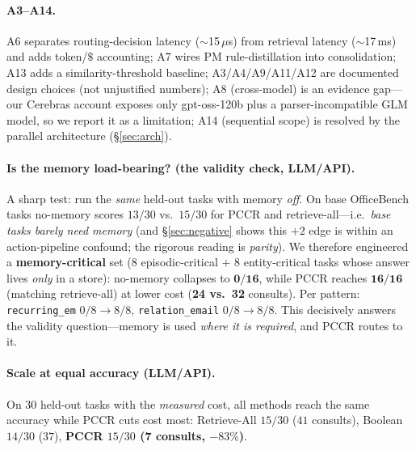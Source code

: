 \documentclass[10pt,twocolumn]{article}
\newcommand{\code}[1]{\texttt{\small #1}}
\begin{document}
\paragraph{A3--A14.} A6 separates routing-decision latency ($\sim$15\,$\mu$s) from
retrieval latency ($\sim$17\,ms) and adds token/$\$$ accounting; A7 wires PM
rule-distillation into consolidation; A13 adds a similarity-threshold baseline;
A3/A4/A9/A11/A12 are documented design choices (not unjustified numbers); A8
(cross-model) is an evidence gap---our Cerebras account exposes only gpt-oss-120b
plus a parser-incompatible GLM model, so we report it as a limitation; A14
(sequential scope) is resolved by the parallel architecture (\S\ref{sec:arch}).

\paragraph{Is the memory load-bearing? (the validity check, LLM/API).} A sharp
test: run the \emph{same} held-out tasks with memory \emph{off}. On base
OfficeBench tasks no-memory scores $13/30$ vs.\ $15/30$ for PCCR and
retrieve-all---i.e.\ \emph{base tasks barely need memory} (and \S\ref{sec:negative}
shows this $+2$ edge is within an action-pipeline confound; the rigorous reading is
\emph{parity}). We therefore engineered
a \textbf{memory-critical} set (8 episodic-critical $+$ 8 entity-critical tasks
whose answer lives \emph{only} in a store): no-memory collapses to $\mathbf{0/16}$,
while PCCR reaches $\mathbf{16/16}$ (matching retrieve-all) at lower cost
(\textbf{24 vs.\ 32} consults). Per pattern: \code{recurring\_em} $0/8{\to}8/8$,
\code{relation\_email} $0/8{\to}8/8$. This decisively answers the validity
question---memory is used \emph{where it is required}, and PCCR routes to it.

\paragraph{Scale at equal accuracy (LLM/API).} On 30 held-out tasks with the
\emph{measured} cost, all methods reach the same accuracy while PCCR cuts cost most:
Retrieve-All $15/30$ ($41$ consults), Boolean $14/30$ ($37$), \textbf{PCCR $15/30$
($\mathbf{7}$ consults, $-83\%$)}.
\end{document}
